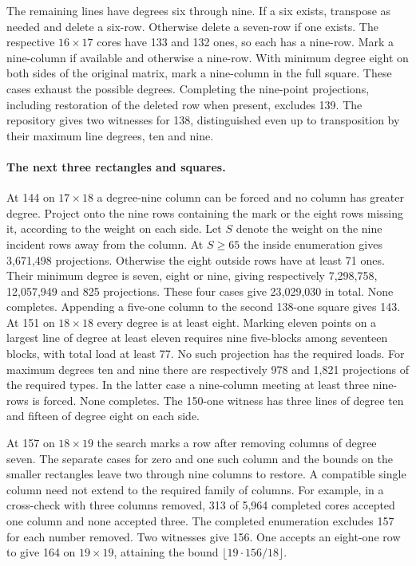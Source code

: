 \documentclass[11pt]{article}
\begin{document}
The remaining lines have degrees six through nine. If a six exists,
transpose as needed and delete a six-row. Otherwise delete a seven-row
if one exists. The respective $16\times17$ cores have 133 and 132 ones,
so each has a nine-row. Mark a nine-column if available and otherwise a
nine-row. With minimum degree eight on both sides of the original matrix,
mark a nine-column in the full square. These cases exhaust the possible
degrees. Completing the nine-point projections, including restoration
of the deleted row when present, excludes 139. The repository gives
two witnesses for 138, distinguished even up to transposition by their
maximum line degrees, ten and nine.

\paragraph{The next three rectangles and squares.}
At 144 on $17\times18$ a degree-nine column can be forced and no
column has greater degree. Project onto the nine rows containing the
mark or the eight rows missing it, according to the weight on each
side. Let $S$ denote the weight on the nine incident rows away from
the column. At $S\ge65$ the inside enumeration gives 3,671,498
projections. Otherwise the eight outside rows have at least 71 ones.
Their minimum degree is seven, eight or nine, giving respectively
7,298,758, 12,057,949 and 825 projections. These four cases give
23,029,030 in total. None
completes. Appending a five-one column to the second 138-one square gives
143. At 151 on $18\times18$ every degree is at least eight. Marking
eleven points on a largest line of degree at least eleven requires nine
five-blocks among seventeen blocks, with total load at least 77. No
such projection has the required loads. For maximum degrees ten and
nine there are respectively 978 and 1,821 projections of the required
types. In the latter case a nine-column meeting at least three nine-rows
is forced. None completes. The 150-one witness has three lines of
degree ten and fifteen of degree eight on each side.

At 157 on $18\times19$ the search marks a row after removing columns
of degree seven. The separate cases for zero and one such column and
the bounds on the smaller rectangles leave two through nine columns
to restore. A compatible single column need not extend to the required
family of columns. For example, in a cross-check with three columns
removed, 313 of 5,964 completed cores accepted one column and none
accepted three. The completed enumeration excludes 157 for each
number removed. Two witnesses give 156. One accepts an eight-one row
to give 164 on $19\times19$, attaining the bound
$\lfloor19\cdot156/18\rfloor$.
\end{document}
